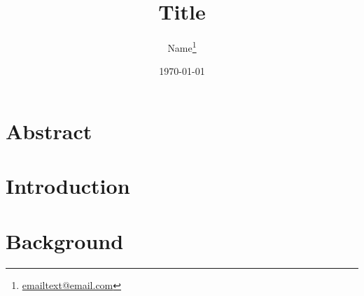 \documentclass[12pt,a4paper,twoside,openright]{report}
\begin{document}
	
\listoftodos

	\title{Title}
	

	\author{Name\footnote{\href{mailto:email@email.com}{emailtext@email.com}}}
	
	
	

	\date{\today}


	
\pagestyle{fancy}
\fancyhf{}
\fancyhead[RE,LO]{\leftmark}%
\fancyhead[LE,RO]{\thepage}
\renewcommand{\chaptermark}[1]{\markboth{\chaptername\ \thechapter\ #1}{}}



\maketitle

\thispagestyle{empty}

\chapter*{\centering Abstract}



\thispagestyle{empty}
\chapterEnd

	
\glsunsetall
	
\tableofcontents
\chapterEnd
	
\listoffigures
\chapterEnd

\printnoidxglossaries %
\chapterEnd

\glsresetall


\chapter{Introduction\label{sc:Intro}} %

\chapterEnd

\chapter{Background\label{sc:Background}}

\chapterEnd




\chapterEnd


	
\end{document}
